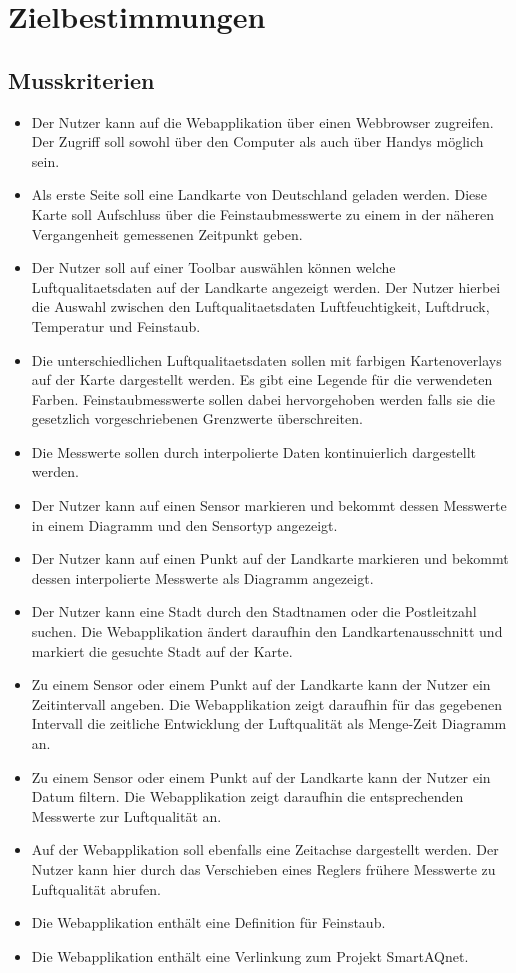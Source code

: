 \section{Zielbestimmungen}
\subsection{Musskriterien}
 \begin{itemize}
	\item Der Nutzer kann auf die Webapplikation über einen Webbrowser zugreifen. 
	Der Zugriff soll sowohl über den Computer als auch über Handys möglich sein.
	\item Als erste Seite soll eine Landkarte von Deutschland geladen werden.
	Diese Karte soll Aufschluss über die Feinstaubmesswerte zu einem in der näheren Vergangenheit gemessenen Zeitpunkt geben.
	\item Der Nutzer soll auf einer \gls{Toolbar} auswählen können welche \gls{Luftqualitaetsdaten} auf der Landkarte angezeigt werden. 
	Der Nutzer hierbei die Auswahl zwischen den \gls{Luftqualitaetsdaten} Luftfeuchtigkeit, Luftdruck, Temperatur und \gls{Feinstaub}.
	\item Die unterschiedlichen \gls{Luftqualitaetsdaten} sollen mit farbigen \glspl{Kartenoverlay} auf der Karte dargestellt werden. 
	Es gibt eine Legende für die verwendeten Farben. Feinstaubmesswerte sollen dabei hervorgehoben werden falls sie die gesetzlich vorgeschriebenen Grenzwerte überschreiten.
	\item Die Messwerte sollen durch interpolierte Daten kontinuierlich dargestellt werden.
	\item Der Nutzer kann auf einen \gls{Sensor} markieren und bekommt dessen Messwerte in einem Diagramm und den Sensortyp angezeigt.
	\item Der Nutzer kann auf einen Punkt auf der Landkarte markieren und bekommt dessen interpolierte Messwerte als Diagramm angezeigt.
	\item Der Nutzer kann eine Stadt durch den Stadtnamen oder die Postleitzahl suchen. 
	Die Webapplikation ändert daraufhin den Landkartenausschnitt und markiert die gesuchte Stadt auf der Karte.
	\item  Zu einem \gls{Sensor} oder einem Punkt auf der Landkarte kann der Nutzer ein Zeitintervall angeben. Die Webapplikation zeigt daraufhin für das gegebenen Intervall 
	die zeitliche Entwicklung der Luftqualität als Menge-Zeit Diagramm an.
	\item Zu einem \gls{Sensor} oder einem Punkt auf der Landkarte kann der Nutzer ein Datum filtern. 
	Die Webapplikation zeigt daraufhin die entsprechenden Messwerte zur Luftqualität an.
	\item Auf der Webapplikation soll ebenfalls eine Zeitachse dargestellt werden. 
	Der Nutzer kann hier durch das Verschieben eines Reglers frühere Messwerte zu Luftqualität abrufen. 
	\item Die Webapplikation enthält eine Definition für \gls{Feinstaub}.
	\item Die Webapplikation enthält eine Verlinkung zum Projekt SmartAQnet. 
\end{itemize}
